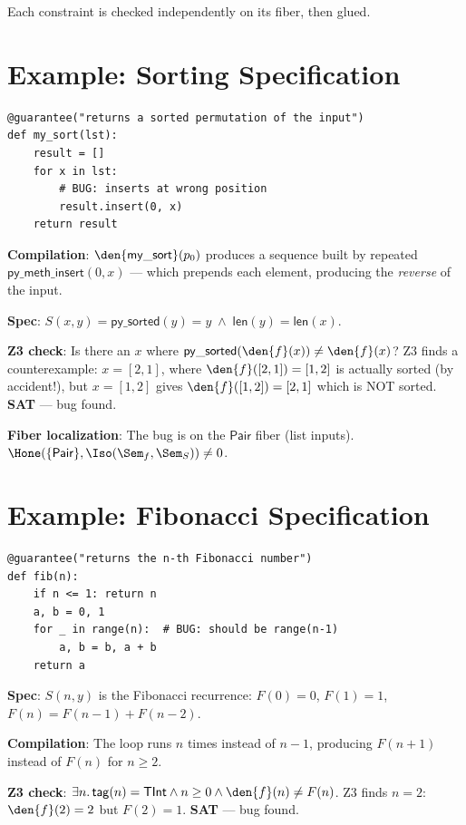Each constraint is checked independently on its fiber, then glued.

\section{Example: Sorting Specification}

\begin{lstlisting}[caption={Sorting with spec check}]
@guarantee("returns a sorted permutation of the input")
def my_sort(lst):
    result = []
    for x in lst:
        # BUG: inserts at wrong position
        result.insert(0, x)
    return result
\end{lstlisting}

\textbf{Compilation}: $\den{\mathsf{my\_sort}}(p_0)$ produces a
sequence built by repeated $\mathsf{py\_meth\_insert}(0, x)$ ---
which prepends each element, producing the \emph{reverse} of the input.

\textbf{Spec}: $S(x, y) = \mathsf{py\_sorted}(y) = y \;\land\;
\mathsf{len}(y) = \mathsf{len}(x)$.

\textbf{Z3 check}: Is there an $x$ where $\mathsf{py\_sorted}(\den{f}(x))
\neq \den{f}(x)$?  Z3 finds a counterexample: $x = [2, 1]$, where
$\den{f}([2,1]) = [1, 2]$ is actually sorted (by accident!), but
$x = [1, 2]$ gives $\den{f}([1,2]) = [2, 1]$ which is NOT sorted.
\textbf{SAT} --- bug found.

\textbf{Fiber localization}: The bug is on the $\mathsf{Pair}$ fiber
(list inputs).  $\Hone(\{\mathsf{Pair}\}, \Iso(\Sem_f, \Sem_S)) \neq 0$.

\section{Example: Fibonacci Specification}

\begin{lstlisting}[caption={Fibonacci with off-by-one bug}]
@guarantee("returns the n-th Fibonacci number")
def fib(n):
    if n <= 1: return n
    a, b = 0, 1
    for _ in range(n):  # BUG: should be range(n-1)
        a, b = b, a + b
    return a
\end{lstlisting}

\textbf{Spec}: $S(n, y)$ is the Fibonacci recurrence:
$F(0) = 0$, $F(1) = 1$, $F(n) = F(n-1) + F(n-2)$.

\textbf{Compilation}: The loop runs $n$ times instead of $n-1$,
producing $F(n+1)$ instead of $F(n)$ for $n \geq 2$.

\textbf{Z3 check}: $\exists n.\, \mathsf{tag}(n) = \mathsf{TInt}
\land n \geq 0 \land \den{f}(n) \neq F(n)$.  Z3 finds $n = 2$:
$\den{f}(2) = 2$ but $F(2) = 1$.  \textbf{SAT} --- bug found.

